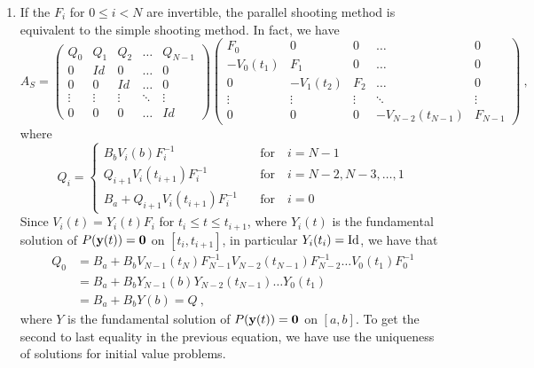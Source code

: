 \begin{rmkList} \label{ParShootPartSepRmk}
\begin{enumerate}
\item If the $F_i$ for $0 \leq i < N$ are invertible, the
parallel shooting method is equivalent to the simple shooting method.
In fact, we have
\[
A_S = \begin{pmatrix} Q_0 & Q_1 & Q_2 & \ldots & Q_{N-1} \\
0 & Id & 0 & \ldots & 0 \\
0 & 0 & Id & \ldots & 0 \\
\vdots & \vdots & \vdots & \ddots & \vdots \\
0 & 0 & 0 & \ldots & Id
\end{pmatrix}
\begin{pmatrix} F_0 & 0 & 0 & \ldots & 0 \\
-V_0(t_1) & F_1 & 0 & \ldots & 0 \\
0 & -V_1(t_2) & F_2 & \ldots & 0 \\
\vdots & \vdots & \vdots & \ddots & \vdots \\
0 & 0 & 0 & -V_{N-2}(t_{N-1}) & F_{N-1}
\end{pmatrix} \ ,
\]
where
\[
Q_i =
\begin{cases}
B_b V_i(b)F_i^{-1} & \quad \text{for} \quad i = N-1 \\
Q_{i+1} V_i(t_{i+1}) F_i^{-1} & \quad \text{for} \quad  i= N-2, N-3, \ldots, 1 \\
B_a + Q_{i+1} V_i(t_{i+1})F_i^{-1} & \quad \text{for} \quad i = 0
\end{cases}
\]
Since $V_i(t) = Y_i(t) F_i$ for $t_i \leq t \leq t_{i+1}$,
where $Y_i(t)$ is the fundamental solution of $P(\mathbf{y}(t)) =\mathbf{0}$
on $[t_i,t_{i+1}]$, in particular $Y_i(t_i) = \operatorname{Id}$, we have
that
\begin{align*}
Q_0 &= B_a + B_b V_{N-1}(t_N)F_{N-1}^{-1} V_{N-2}(t_{N-1})F_{N-2}^{-1}
\ldots V_0(t_1)F_0^{-1} \\
&= B_a + B_b Y_{N-1}(b) Y_{N-2}(t_{N-1}) \ldots Y_0(t_1) \\
&= B_a + B_b Y(b) = Q \ ,
\end{align*}
where $Y$ is the fundamental solution of
$P(\mathbf{y}(t)) = \mathbf{0}$ on $[a,b]$.  To get the second to last
equality in the previous equation, we have use the uniqueness of
solutions for initial value problems.


\end{enumerate}
\end{rmkList}
